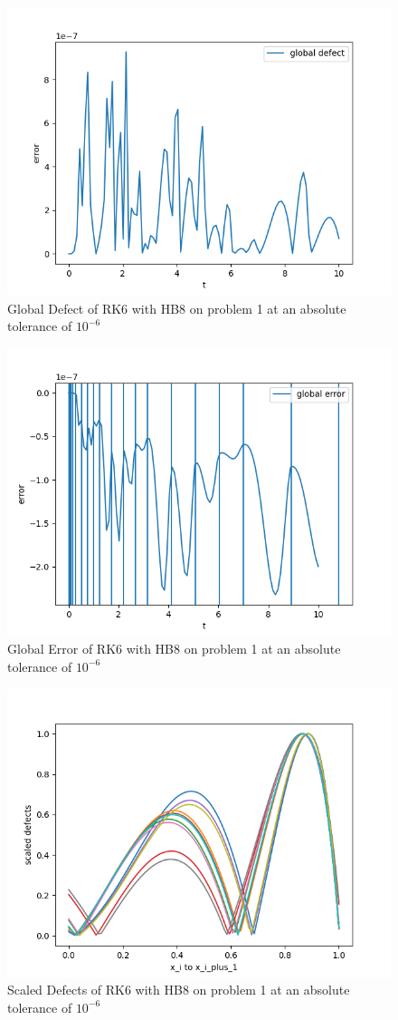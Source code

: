 \documentclass{article}
\begin{document}
\begin{figure}[H]
\centering
\includegraphics[width=0.7\linewidth]{./figures/rk6_with_hb8_p1_global_defect}
\caption{Global Defect of RK6 with HB8 on problem 1 at an absolute tolerance of $10^{-6}$}
\label{fig:rk6_with_hb8_p1_global_defect}
\end{figure}

\begin{figure}[H]
\centering
\includegraphics[width=0.7\linewidth]{./figures/rk6_with_hb8_p1_global_error}
\caption{Global Error of RK6 with HB8 on problem 1 at an absolute tolerance of $10^{-6}$}
\label{fig:rk6_with_hb8_p1_global_error}
\end{figure}

\begin{figure}[H]
\centering
\includegraphics[width=0.7\linewidth]{./figures/rk6_with_hb8_p1_scaled_defects}
\caption{Scaled Defects of RK6 with HB8 on problem 1 at an absolute tolerance of $10^{-6}$}
\label{fig:rk6_with_hb8_p1_scaled_defects}
\end{figure}
\end{document}
